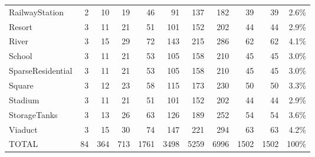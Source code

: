 \begin{table}[h]
\begin{tabular}{lrrrrrrrrrr}
RailwayStation & 2 & 10 & 19 & 46 & 91 & 137 & 182 & 39 & 39 & 2.6\% \\
Resort & 3 & 11 & 21 & 51 & 101 & 152 & 202 & 44 & 44 & 2.9\% \\
River & 3 & 15 & 29 & 72 & 143 & 215 & 286 & 62 & 62 & 4.1\% \\
School & 3 & 11 & 21 & 53 & 105 & 158 & 210 & 45 & 45 & 3.0\% \\
SparseResidential & 3 & 11 & 21 & 53 & 105 & 158 & 210 & 45 & 45 & 3.0\% \\
Square & 3 & 12 & 23 & 58 & 115 & 173 & 230 & 50 & 50 & 3.3\% \\
Stadium & 3 & 11 & 21 & 51 & 101 & 152 & 202 & 44 & 44 & 2.9\% \\
StorageTanks & 3 & 13 & 26 & 63 & 126 & 189 & 252 & 54 & 54 & 3.6\% \\
Viaduct & 3 & 15 & 30 & 74 & 147 & 221 & 294 & 63 & 63 & 4.2\% \\
\midrule TOTAL & 84 & 364 & 713 & 1761 & 3498 & 5259 & 6996 & 1502 & 1502 & 100\% \\\bottomrule
\end{tabular}\end{table}
